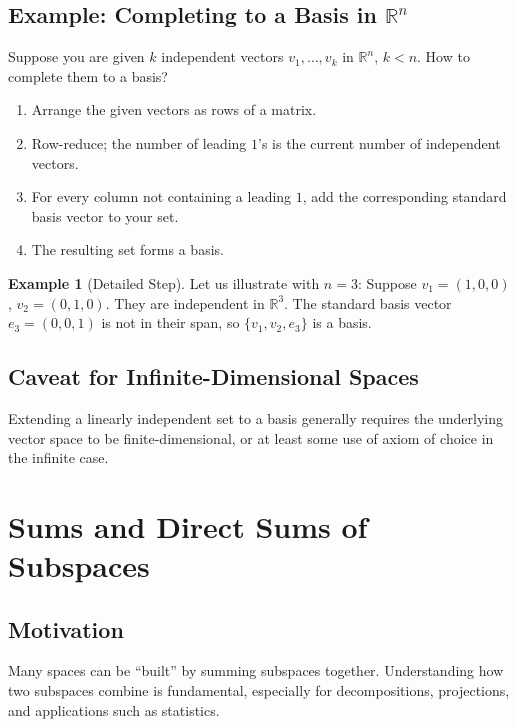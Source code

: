 \documentclass[11pt]{article}
\theoremstyle{definition}
\newtheorem{example}[definition]{Example}
\theoremstyle{plain}
\begin{document}
\subsection{Example: Completing to a Basis in $\mathbb{R}^n$}

Suppose you are given $k$ independent vectors $v_1, \ldots, v_k$ in $\mathbb{R}^n$, $k < n$. How to complete them to a basis?

\begin{enumerate}
    \item Arrange the given vectors as rows of a matrix.
    \item Row-reduce; the number of leading $1$'s is the current number of independent vectors.
    \item For every column not containing a leading $1$, add the corresponding standard basis vector to your set.
    \item The resulting set forms a basis.
\end{enumerate}

\begin{example}[Detailed Step]
Let us illustrate with $n=3$:
Suppose $v_1 = (1,0,0)$, $v_2 = (0,1,0)$. They are independent in $\mathbb{R}^3$. The standard basis vector $e_3 = (0,0,1)$ is not in their span, so $\{v_1, v_2, e_3\}$ is a basis.
\end{example}

\subsection{Caveat for Infinite-Dimensional Spaces}

Extending a linearly independent set to a basis generally requires the underlying vector space to be finite-dimensional, or at least some use of axiom of choice in the infinite case.

\section{Sums and Direct Sums of Subspaces}

\subsection{Motivation}

Many spaces can be ``built'' by summing subspaces together. Understanding how two subspaces combine is fundamental, especially for decompositions, projections, and applications such as statistics.
\end{document}
